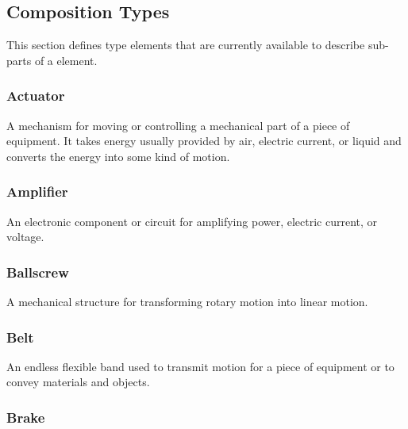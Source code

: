 \subsection{Composition Types} \label{sec:CompositionTypes}


This section defines  type elements that are currently available to describe sub-parts of a  element.


\subsubsection{Actuator}
  \label{sec:Actuator}



A mechanism for moving or controlling a mechanical part of a piece of equipment.   
 It takes energy usually provided by air, electric current, or liquid and converts the energy into some kind of motion. 

\FloatBarrier

\subsubsection{Amplifier}
  \label{sec:Amplifier}



An electronic component or circuit for amplifying power, electric current, or voltage.

\FloatBarrier

\subsubsection{Ballscrew}
  \label{sec:Ballscrew}



A mechanical structure for transforming rotary motion into linear motion.

\FloatBarrier

\subsubsection{Belt}
  \label{sec:Belt}



An endless flexible band used to transmit motion for a piece of equipment or to convey materials and objects.

\FloatBarrier

\subsubsection{Brake}
  \label{sec:Brake}




